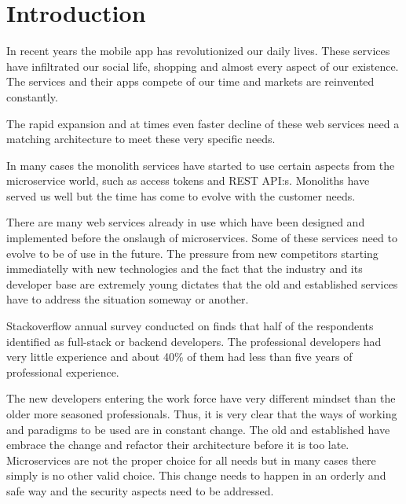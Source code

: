 


\section{Introduction}
\begin{sloppypar}

    In recent years the mobile app has revolutionized our daily lives. 
    These services have infiltrated our social life, shopping and almost 
    every aspect of our existence. The services and their apps compete of 
    our time and markets are reinvented constantly.

    The rapid expansion and at times even faster decline of these web services 
    need a matching architecture to meet these very specific needs. 

    In many cases the monolith services have started to use certain aspects 
    from the microservice world, such as access tokens and REST API:s. 
    Monoliths have served us well but the time has come to evolve with the customer needs.

    There are many web services already in use which have been designed and 
    implemented before the onslaugh of microservices. Some of these services 
    need to evolve to be of use in the future. The pressure from new competitors 
    starting immediatelly with new technologies and the fact that the industry and its 
    developer base are extremely young dictates that the old and established services
    have to address the situation someway or another.

    Stackoverflow annual survey \citep{stackoverflowsurvey2019} conducted on finds that half of 
    the respondents identified as full-stack or backend developers. 
    The professional developers had very little experience 
    and about 40\% of them had less than five years of professional experience. 

    The new developers entering the work force have very different mindset than the older 
    more seasoned professionals. Thus, it is very clear that the ways of working and 
    paradigms to be used are in constant change. The old and established have embrace 
    the change and refactor their architecture before it is too late. Microservices are 
    not the proper choice for all needs \citep{newman2019} but in many cases there simply 
    is no other valid choice. This change needs to happen in an orderly and 
    safe way and the security aspects need to be addressed. 


\end{sloppypar}
